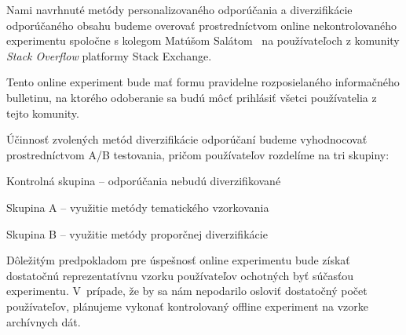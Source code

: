 Nami navrhnuté metódy personalizovaného odporúčania a diverzifikácie odporúčaného obsahu budeme overovať prostredníctvom
online nekontrolovaného experimentu spoločne s kolegom Matúšom Salátom~\cite{Salat2018} na používateľoch z komunity \textit{Stack Overflow} platformy Stack Exchange.

Tento online experiment bude mať formu pravidelne rozposielaného informačného bulletinu, na ktorého odoberanie sa budú
môcť prihlásiť všetci používatelia z tejto komunity.

Účinnosť zvolených metód diverzifikácie odporúčaní budeme vyhodnocovať prostredníctvom A/B testovania, pričom používateľov
rozdelíme na tri skupiny:
\begin{my_enumerate}
    \item{Kontrolná skupina -- odporúčania nebudú diverzifikované}
    \item{Skupina A -- využitie metódy tematického vzorkovania}
    \item{Skupina B -- využitie metódy proporčnej diverzifikácie}
\end{my_enumerate}

Dôležitým predpokladom pre úspešnosť online experimentu bude získať dostatočnú reprezentatívnu vzorku používateľov
ochotných byť súčasťou experimentu. V~prípade, že by sa nám nepodarilo osloviť dostatočný počet používateľov, plánujeme
vykonať kontrolovaný offline experiment na vzorke archívnych dát.


